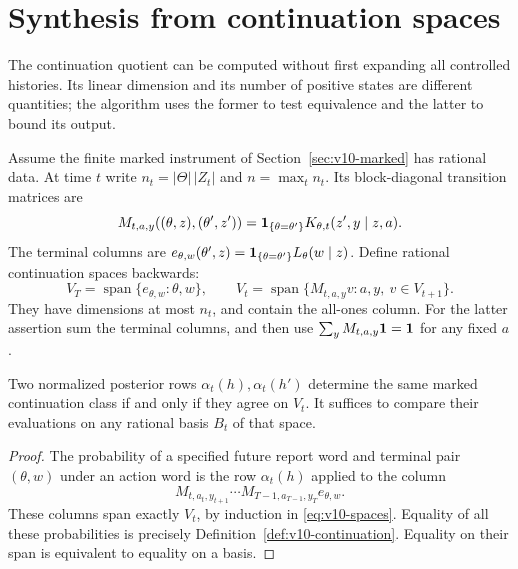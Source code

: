 \section{Synthesis from continuation spaces}
\label{sec:v10-synthesis}

The continuation quotient can be computed without first expanding
all controlled histories. Its linear dimension and its number of
positive states are different quantities; the algorithm uses the
former to test equivalence and the latter to bound its output.

Assume the finite marked instrument of Section~\ref{sec:v10-marked}
has rational data. At time $t$ write $n_t=|\Theta|\,|Z_t|$ and
$n=\max_t n_t$. Its block-diagonal transition matrices are
\[
 M_{t,a,y}((\theta,z),(\theta',z'))
 =\mathbf 1_{\{\theta=\theta'\}}K_{\theta,t}(z',y\mid z,a).
\]
The terminal columns are
$e_{\theta,w}(\theta',z)=\mathbf 1_{\{\theta=\theta'\}}
L_\theta(w\mid z)$. Define rational continuation spaces backwards:
\begin{equation}\label{eq:v10-spaces}
 V_T=\operatorname{span}\{e_{\theta,w}:\theta,w\},\qquad
 V_t=\operatorname{span}\{M_{t,a,y}v:a,y,\ v\in V_{t+1}\}.
\end{equation}
They have dimensions at most $n_t$, and contain the all-ones column.
For the latter assertion sum the terminal columns, and then use
$\sum_yM_{t,a,y}\mathbf 1=\mathbf 1$ for any fixed $a$.

\begin{lemma}\label{lem:v10-span}
Two normalized posterior rows $\alpha_t(h),\alpha_t(h')$ determine
the same marked continuation class if and only if they agree on
$V_t$. It suffices to compare their evaluations on any rational basis
$B_t$ of that space.
\end{lemma}
\begin{proof}
The probability of a specified future report word and terminal pair
$(\theta,w)$ under an action word is the row $\alpha_t(h)$ applied
to the column
\[
 M_{t,a_t,y_{t+1}}\cdots M_{T-1,a_{T-1},y_T}e_{\theta,w}.
\]
These columns span exactly $V_t$, by induction in
\eqref{eq:v10-spaces}. Equality of all these probabilities is precisely
Definition~\ref{def:v10-continuation}. Equality on their span is
equivalent to equality on a basis.
\end{proof}

